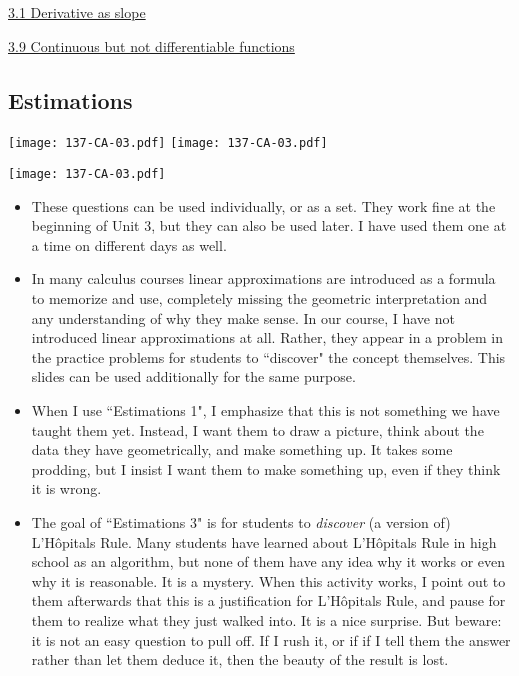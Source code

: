 \documentclass[11pt]{article}
\newcommand{\nl}{\hfill \vspace{-1.1\baselineskip}} %
\newcommand{\vi}{\hspace{8mm} \href{https://www.youtube.com/watch?v=7vhux5TLRmQ&list=PLlwePzQY_wW8qiZD6XYqCnibdY37ygbx7&index=1}{3.1 Derivative as slope}}
\newcommand{\vix}{\hspace{8mm} \href{https://www.youtube.com/watch?v=QBmUyi64zf8&list=PLlwePzQY_wW8qiZD6XYqCnibdY37ygbx7&index=9}{3.9 Continuous but not differentiable functions}}
\begin{document}
\begin{videos}
\vi

\vix
\end{videos}



\newpage


\subsection{Estimations} 

\begin{center}
{ \texttt{[image: 137-CA-03.pdf]}} \quad
{ \texttt{[image: 137-CA-03.pdf]}}

{ \texttt{[image: 137-CA-03.pdf]}}
\end{center}

\vspace{-10mm}
\begin{comments}
\nl
	\begin{itemize}
		\item These questions can be used individually, or as a set.  They work fine at the beginning of Unit 3, but they can also be used later.   I have used them one at a time on different days as well.
		\item In many calculus courses linear approximations are introduced as a formula to memorize and use, completely missing the geometric interpretation and any understanding of why they make sense.  In our course, I have not introduced linear approximations at all.  Rather, they appear in a problem in the practice problems for students to ``discover" the concept themselves.  This slides can be used additionally for the same purpose.
		\item When I use ``Estimations 1", I emphasize that this is not something we have taught them yet.  Instead, I want them to draw a picture, think about the data they have geometrically, and make something up.  It takes some prodding, but I insist I want them to make something up, even if they think it is wrong.  
		\item  The goal of ``Estimations 3" is for students to \emph{discover} (a version of) L'H\^opitals Rule.  Many students have learned about  L'H\^opitals Rule in high school as an algorithm, but none of them have any idea why it works or even why it is reasonable.  It is a mystery.    When this activity works, I point out to them afterwards that this is a justification for  L'H\^opitals Rule, and pause for them to realize what they just walked into.  It is a nice surprise.  But beware: it is not an easy question to pull off.  If I rush it, or if if I tell them the answer rather than let them deduce it, then the beauty of the result is lost.
	\end{itemize}
\end{comments}
\end{document}
